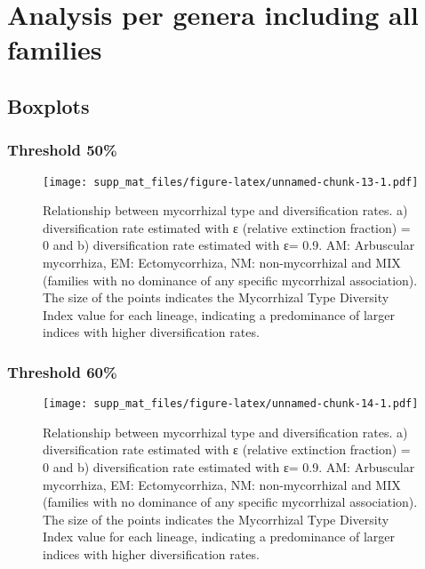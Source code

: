\documentclass[]{article}
\begin{document}
\hypertarget{analysis-per-genera-including-all-families}{%
\section{Analysis per genera including all
families}\label{analysis-per-genera-including-all-families}}

\hypertarget{boxplots-1}{%
\subsection{Boxplots}\label{boxplots-1}}

\hypertarget{threshold-50-1}{%
\subsubsection{Threshold 50\%}\label{threshold-50-1}}

\begin{figure}
\centering
\texttt{[image: supp\_mat\_files/figure-latex/unnamed-chunk-13-1.pdf]}
\caption{Relationship between mycorrhizal type and diversification
rates. a) diversification rate estimated with ε (relative extinction
fraction) = 0 and b) diversification rate estimated with ε= 0.9. AM:
Arbuscular mycorrhiza, EM: Ectomycorrhiza, NM: non-mycorrhizal and MIX
(families with no dominance of any specific mycorrhizal association).
The size of the points indicates the Mycorrhizal Type Diversity Index
value for each lineage, indicating a predominance of larger indices with
higher diversification rates.}
\end{figure}

\hypertarget{threshold-60-1}{%
\subsubsection{Threshold 60\%}\label{threshold-60-1}}

\begin{figure}
\centering
\texttt{[image: supp\_mat\_files/figure-latex/unnamed-chunk-14-1.pdf]}
\caption{Relationship between mycorrhizal type and diversification
rates. a) diversification rate estimated with ε (relative extinction
fraction) = 0 and b) diversification rate estimated with ε= 0.9. AM:
Arbuscular mycorrhiza, EM: Ectomycorrhiza, NM: non-mycorrhizal and MIX
(families with no dominance of any specific mycorrhizal association).
The size of the points indicates the Mycorrhizal Type Diversity Index
value for each lineage, indicating a predominance of larger indices with
higher diversification rates.}
\end{figure}
\end{document}
